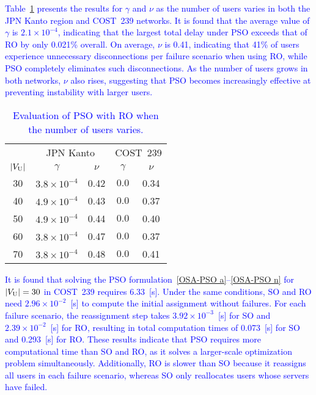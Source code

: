 \documentclass[10pt, letterpaper]{IEEEtran}
\newcommand\blue[1]{\textcolor{blue}{#1}}
\begin{document}
\begin{CJK}{UTF8}{ipxm}
\blue{
Table~\ref{tab:OSA-PSO_gamma_nu} presents the results for $\gamma$ and $\nu$ as the number of users varies in both the JPN Kanto region and COST~239 networks.
It is found that the average value of $\gamma$ is $2.1 \times 10^{-4}$, indicating that the largest total delay under PSO exceeds that of RO by only 0.021\% overall.
On average, $\nu$ is 0.41, indicating that 41\% of users experience unnecessary disconnections per failure scenario when using RO, while PSO completely eliminates such disconnections.
As the number of users grows in both networks, $\nu$ also rises, suggesting that PSO becomes increasingly effective at preventing instability with larger users.
}
\begin{table}[t]
  \caption{\blue{Evaluation of PSO with RO when the number of users varies.}}
  \label{tab:OSA-PSO_gamma_nu}
  \begin{center}
    \begin{tabular}{c|cc|cc}
      \hline
      & \multicolumn{2}{c|}{JPN Kanto} & \multicolumn{2}{c}{COST~239} \\ \cline{2-5}
      $|V_{\rm{U}}|$ & $\gamma$ & $\nu$ & $\gamma$ & $\nu$ \\
      \hline
      30 & $3.8 \times 10^{-4}$ & 0.42 & $0.0$ & 0.34 \\
      40 & $4.9 \times 10^{-4}$ & 0.43 & $0.0$ & 0.37 \\
      50 & $4.9 \times 10^{-4}$ & 0.44 & $0.0$ & 0.40 \\
      60 & $3.8 \times 10^{-4}$ & 0.47 & $0.0$ & 0.37 \\
      70 & $3.8 \times 10^{-4}$ & 0.48 & $0.0$ & 0.41 \\
      \hline
    \end{tabular}
  \end{center}
\end{table}

\blue{
It is found that solving the PSO formulation~\eqref{OSA-PSO a}--\eqref{OSA-PSO n} for $|V_{\rm U}|=30$ in COST~239 requires 6.33~[s].
Under the same conditions, SO and RO need $2.96 \times 10^{-2}$~[s] to compute the initial assignment without failures.
For each failure scenario, the reassignment step takes $3.92 \times 10^{-3}$~[s] for SO and $2.39 \times 10^{-2}$~[s] for RO, resulting in total computation times of 0.073~[s] for SO and 0.293~[s] for RO.
These results indicate that PSO requires more computational time than SO and RO, as it solves a larger-scale optimization problem simultaneously.
Additionally, RO is slower than SO because it reassigns all users in each failure scenario, whereas SO only reallocates users whose servers have failed.
}


\end{CJK}
\end{document}
